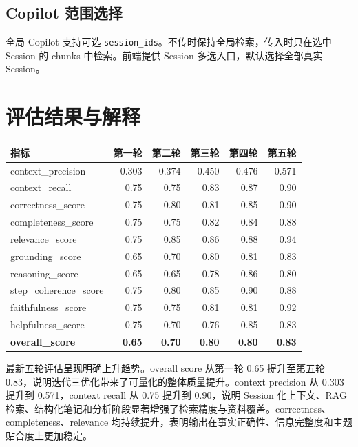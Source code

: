 \documentclass[12pt,a4paper,onecolumn]{ctexart}
\newcommand{\code}[1]{\texttt{#1}}
\begin{document}
\subsection{Copilot 范围选择}

全局 Copilot 支持可选 \code{session\_ids}。不传时保持全局检索，传入时只在选中 Session 的 chunks 中检索。前端提供 Session 多选入口，默认选择全部真实 Session。

\section{评估结果与解释}

\small
\begin{longtable}{p{3.7cm}rrrrr}
\toprule
\textbf{指标} & \textbf{第一轮} & \textbf{第二轮} & \textbf{第三轮} & \textbf{第四轮} & \textbf{第五轮} \\
\midrule
context\_precision & 0.303 & 0.374 & 0.450 & 0.476 & 0.571 \\
context\_recall & 0.75 & 0.75 & 0.83 & 0.87 & 0.90 \\
correctness\_score & 0.75 & 0.80 & 0.81 & 0.85 & 0.90 \\
completeness\_score & 0.75 & 0.75 & 0.82 & 0.84 & 0.88 \\
relevance\_score & 0.75 & 0.85 & 0.86 & 0.88 & 0.94 \\
grounding\_score & 0.65 & 0.70 & 0.80 & 0.81 & 0.83 \\
reasoning\_score & 0.65 & 0.65 & 0.78 & 0.86 & 0.80 \\
step\_coherence\_score & 0.75 & 0.80 & 0.85 & 0.90 & 0.88 \\
faithfulness\_score & 0.75 & 0.75 & 0.81 & 0.81 & 0.92 \\
helpfulness\_score & 0.75 & 0.70 & 0.76 & 0.85 & 0.83 \\
\textbf{overall\_score} & \textbf{0.65} & \textbf{0.70} & \textbf{0.80} & \textbf{0.80} & \textbf{0.83} \\
\bottomrule
\end{longtable}
\normalsize

最新五轮评估呈现明确上升趋势。overall score 从第一轮 0.65 提升至第五轮 0.83，说明迭代三优化带来了可量化的整体质量提升。context precision 从 0.303 提升到 0.571，context recall 从 0.75 提升到 0.90，说明 Session 化上下文、RAG 检索、结构化笔记和分析阶段显著增强了检索精度与资料覆盖。correctness、completeness、relevance 均持续提升，表明输出在事实正确性、信息完整度和主题贴合度上更加稳定。
\end{document}
